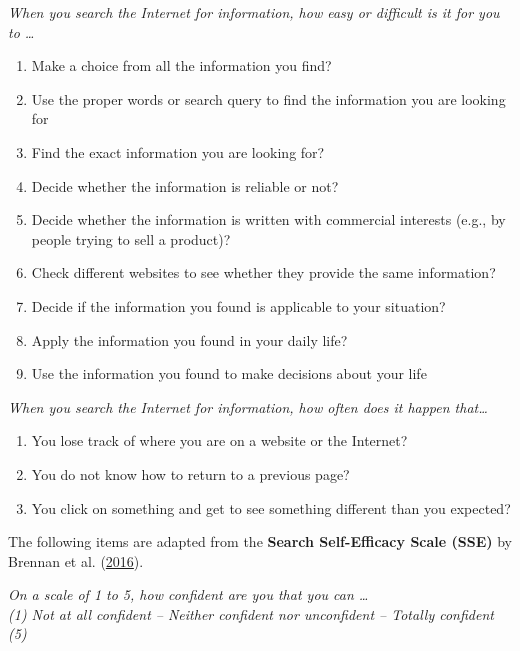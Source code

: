 \documentclass[letterpaper, nobind]{templates/ociamthesis}
\providecommand{\tightlist}{%
  \setlength{\itemsep}{0pt}\setlength{\parskip}{0pt}}
\begin{document}
\emph{When you search the Internet for information, how easy or difficult is it for you to \ldots{}}

\begin{enumerate}
\def\labelenumi{\arabic{enumi}.}
\setcounter{enumi}{6}
\tightlist
\item
  Make a choice from all the information you find?
\item
  Use the proper words or search query to find the information you are looking for
\item
  Find the exact information you are looking for?
\item
  Decide whether the information is reliable or not?
\item
  Decide whether the information is written with commercial interests (e.g., by people trying to sell a product)?
\item
  Check different websites to see whether they provide the same information?
\item
  Decide if the information you found is applicable to your situation?
\item
  Apply the information you found in your daily life?
\item
  Use the information you found to make decisions about your life
\end{enumerate}

\emph{When you search the Internet for information, how often does it happen that\ldots{}}

\begin{enumerate}
\def\labelenumi{\arabic{enumi}.}
\setcounter{enumi}{15}
\tightlist
\item
  You lose track of where you are on a website or the Internet?
\item
  You do not know how to return to a previous page?
\item
  You click on something and get to see something different than you expected?
\end{enumerate}

The following items are adapted from the \textbf{Search Self-Efficacy Scale (SSE)} by Brennan et al. (\protect\hyperlink{ref-brennan2016factor}{2016}).

\emph{On a scale of 1 to 5, how confident are you that you can \ldots{}\\
(1) Not at all confident -- Neither confident nor unconfident -- Totally confident (5)}
\end{document}

